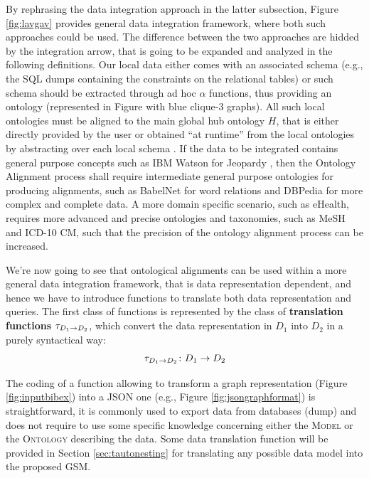 \begin{example}
By rephrasing the data integration approach in the latter subsection, Figure \ref{fig:lavgav} provides general data integration framework, where both such approaches could be used. The difference between the two approaches are hidded by the \textup{integration} arrow, that is going to be expanded and analyzed in the following definitions. Our local data either comes with an associated schema (e.g., the SQL dumps containing the constraints on the relational tables) or such schema should be extracted through ad hoc $\alpha$ functions, thus providing an ontology (represented in Figure with blue clique-3 graphs). All such local ontologies must be aligned to the main global hub ontology $H$, that is either directly provided by the user or obtained ``at runtime'' from the local ontologies by abstracting over each local schema \cite{BaaziziLCGS17}. If the data to be integrated contains general purpose concepts such as IBM Watson for Jeopardy \cite{IBMWatson}, then the Ontology Alignment process shall require intermediate general purpose ontologies for producing alignments, such as BabelNet for word relations and DBPedia for more complex and complete data. A more domain specific scenario, such as eHealth, requires more advanced and precise ontologies and taxonomies, such as MeSH and ICD-10 CM, such that the precision of the ontology alignment process can be increased.
\end{example}

We're now going to see that ontological alignments can be used within a more general data integration framework, that is   data representation dependent, and hence we have to introduce functions to   translate both data representation and   queries. The first class of functions is  represented by the class of \textbf{translation functions} $\ttransl_{D_1\to D_2}$, which convert the data representation in $D_1$ into $D_2$ in a purely syntactical way:
\begin{equation}
\label{eq:taufun}
\ttranslTHIS_{D_1\to D_2}\colon D_1\to D_2
\end{equation}

\begin{example}
The coding of a function allowing to transform a graph representation (Figure \vref{fig:inputbibex}) into a JSON one (e.g., Figure \vref{fig:jsongraphformat}) is straightforward, it is commonly used to export data from databases (dump) and does not require to use some specific knowledge concerning either the \textsc{Model} or the \textsc{Ontology} describing the data. Some data translation function will be provided in Section \vref{sec:tautonesting} for translating any possible data model into the proposed GSM.
\end{example}

